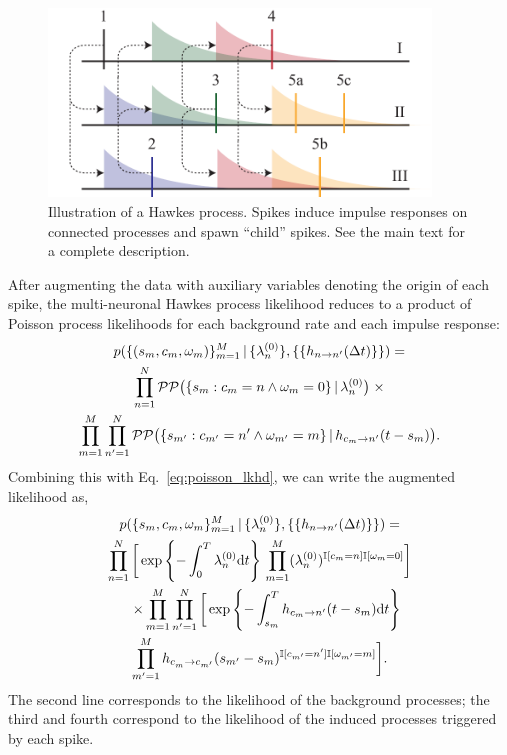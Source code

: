 \begin{figure}[t]
\centering%
\includegraphics[width=4in]{figures/ch3/Hawkes-wide} 
\vspace{-0.25cm}
\caption[Illustration of a Hawkes process]{Illustration of a Hawkes
  process. Spikes induce impulse responses on connected processes and
  spawn ``child'' spikes. See the main text for a complete
  description.}
\label{fig:hawkes}
\end{figure}

After augmenting the data with auxiliary variables denoting the origin
of each spike, the multi-neuronal Hawkes process likelihood reduces to 
a product of Poisson process likelihoods for each background rate and 
each impulse response:
\begin{multline*}
  p(\{(s_m,c_m,\omega_m)\}_{m=1}^M \,|\, 
  \{\lambda^{(0)}_{n}\}, \{\{h_{n \to n'}(\Delta t)\}\}) = \\
  \prod_{n=1}^N \mathcal{PP} \big(\{s_{m}: c_{m}=n \wedge \omega_{m}=0\} \,|\, \lambda^{(0)}_{n} \big) \; \times\\
  \prod_{m=1}^M \prod_{n'=1}^N \mathcal{PP} \big(\{s_{m'}: c_{m'}=n' \wedge \omega_{m'}=m\} \,|\, h_{c_m \to n'}(t-s_m) \big).
\end{multline*}
Combining this with 
Eq.~\ref{eq:poisson_lkhd}, we can
write the augmented likelihood as,
\begin{multline}
  \label{eq:hawkes_likelihood}
  p(\{s_m, c_m, \omega_m\}_{m=1}^M \,|\, \{\lambda^{(0)}_{n}\}, \{\{h_{n \to n'}(\Delta t)\}\}) = \\
  \prod^N_{n=1} \bigg[
  \exp\left\{ -\int_0^T \lambda^{(0)}_{n}\mathrm{d}t \right\} \,
  \prod^M_{m=1}
   (\lambda^{(0)}_{n})^{\mathbb{I}[c_m=n] \mathbb{I}[\omega_m = 0]} \bigg]\\
  \quad\times \prod_{m=1}^M \prod_{n'=1}^N \bigg[
  \exp\left\{-\int^T_{s_m} h_{c_m \to n'}(t - s_m) \mathrm{d}t \right\} \\
  \prod_{m'=1}^M h_{c_m^{~} \to c_{m'}}(s_{m'}-s_m)^{\mathbb{I}[c_{m'}=n'] \mathbb{I}[\omega_{m'}=m]}\bigg].
\end{multline}
The second line corresponds to the likelihood of the background
processes; the third and fourth correspond to the likelihood of the
induced processes triggered by each spike.

